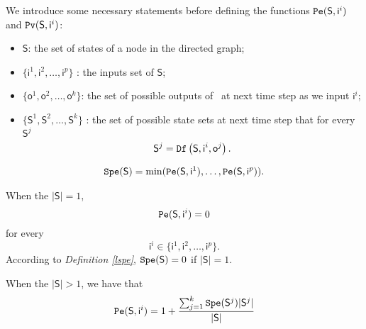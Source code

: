 We introduce some necessary statements before defining the functions ${\tt Pe}(\mathsf{S},\mathsf{ i}^{i})$ and ${\tt Pv}(\mathsf{S},\mathsf{ i}^{i})$:
\begin{itemize}
  \item $\mathsf{S}$: the set of states of a node in the directed graph;
  \item $\{\mathsf{ i}^{1},\mathsf{ i}^{2},\ldots, \mathsf{ i}^{p}\}$ : the inputs set of $\mathsf{S}$;
  \item $\{\mathsf{o}^1,\mathsf{o}^2,\ldots,\mathsf{o}^k\}$: the set of possible outputs of \BCN\ at next time step as we input $\mathsf{ i}^{i}$;
 \item $\{\mathsf{S}^{1},\mathsf{S}^{2},\ldots, \mathsf{S}^{k}\}$ : the set of possible state sets at next time step that for every $\mathsf{S}^{j}$ \[\mathsf{S}^{j}={\tt Df}\left(\mathsf{S},\mathsf{i}^{i},\mathsf{o}^{j}\right).\] 
  
\end{itemize} 
\begin{definition} \label{lspe}
\begin{equation}
\begin{split}
{\tt Spe}(\mathsf{S})= \min({\tt Pe}(\mathsf{S}, \mathsf{ i}^{1}),\ldots,{\tt Pe}(\mathsf{S}, \mathsf{ i}^{p})).
\end{split}
\end{equation}
\end{definition}

\begin{definition} \label{spe}

When the $|\mathsf{S}|=1$,
\[{\tt Pe}(\mathsf{S}, \mathsf{ i}^{i})=0\]  for every \[\mathsf{ i}^{i} \in \{\mathsf{ i}^{1},\mathsf{ i}^{2},\ldots, \mathsf{ i}^{p}\}.\] According to {\em Definition \ref{lspe}}, ${\tt Spe}(\mathsf{S})=0$ if $|\mathsf{S}|=1$. 

When the $|\mathsf{S}|>1$, 
we have that  
\begin{equation}
\begin{split}
{\tt Pe}(\mathsf{S}, \mathsf{ i}^{i})=1 +\frac{\sum_{j=1}^k {\tt Spe}(\mathsf{S}^{j})|\mathsf{S}^{j}|}{ |\mathsf{S}|}
\end{split}
\end{equation}
\end{definition}

